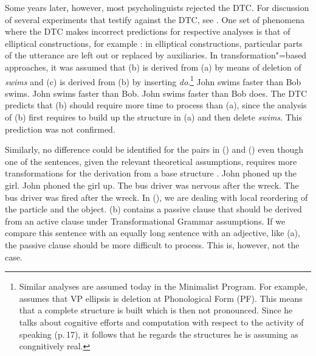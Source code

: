 Some years later, however, most psycholinguists rejected the DTC. For discussion of several experiments that testify against
the DTC, see . One set of phenomena where the DTC makes incorrect predictions for respective analyses is that of elliptical constructions, for example
\citep*[]{FBG74a-u}: in elliptical constructions, particular parts of the utterance are left out or replaced by auxiliaries.
In transformation"=based approaches, it was assumed that (b) is derived from (a) by means of deletion of
\emph{swims} and (c) is derived from (b) by inserting \emph{do}.\footnote{
  Similar analyses are assumed today in the Minimalist Program. For example, \citet[]{Trinh2011a} assumes that VP ellipsis is deletion at Phonological Form (PF). This means that
  a complete structure is built which is then not pronounced. Since he talks about cognitive efforts
  and computation with respect to the activity of speaking (p.\,17), it follows that he regards the
  structures he is assuming as congnitively real.
}
\eal
\ex John swims faster than Bob swims.
\ex John swims faster than Bob.
\ex John swims faster than Bob does.
\zl
The DTC predicts that (b) should require more time to process than (a),
since the analysis of (b) first requires to build up the structure in (a) and then delete \emph{swims}. This prediction was not confirmed.

Similarly, no difference could be identified for the pairs in () and () even though one of the sentences, given the relevant theoretical
assumptions, requires more
transformations for the derivation from a base structure \citep*[]{FBG74a-u}.
\eal
\ex John phoned up the girl.
\ex John phoned the girl up.
\zl
\eal
\ex The bus driver was nervous after the wreck.
\ex The bus driver was fired after the wreck.
\zl
In (), we are dealing with local reordering of the particle and the object. (b) contains a passive clause that
should be derived from an active clause under Transformational Grammar assumptions. If we compare this sentence with an equally long sentence
with an adjective, like (a), the passive clause should be more difficult to process. This is, however, not the case.

